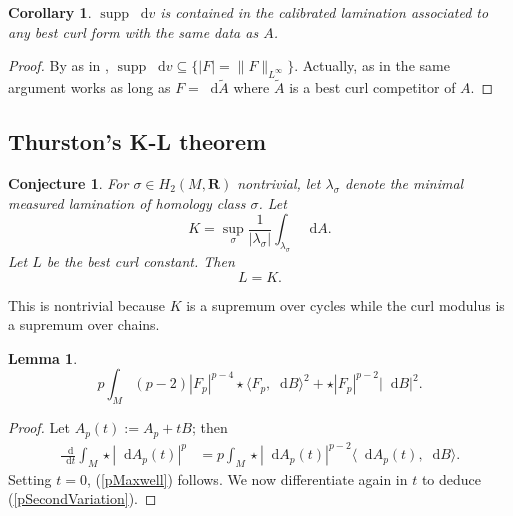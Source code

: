 \documentclass[reqno,11pt]{amsart}
\newcommand{\RR}{\mathbf{R}}
\newcommand*\dif{\mathop{}\!\mathrm{d}}
\DeclareMathOperator{\supp}{supp}
\newtheorem{lemma}[theorem]{Lemma}
\newtheorem{corollary}[theorem]{Corollary}
\newtheorem{conjecture}[theorem]{Conjecture}
\theoremstyle{definition}
\numberwithin{equation}{section}
\begin{document}
\begin{corollary}
$\supp \dif v$ is contained in the calibrated lamination associated to any best curl form with the same data as $A$.
\end{corollary}
\begin{proof}
By as in \cite[Theorem 6.1]{daskalopoulos2020transverse}, $\supp \dif v \subseteq \{|F| = \|F\|_{L^\infty}\}$.
Actually, as in \cite[Corollary 6.8]{daskalopoulos2020transverse} the same argument works as long as $F = \dif \tilde A$ where $\tilde A$ is a best curl competitor of $A$.
\end{proof}

\subsection{Thurston's K-L theorem}
\begin{conjecture}
For $\sigma \in H_2(M, \RR)$ nontrivial, let $\lambda_\sigma$ denote the minimal measured lamination of homology class $\sigma$.
Let 
$$K = \sup_\sigma \frac{1}{|\lambda_\sigma|} \int_{\lambda_\sigma} \dif A.$$
Let $L$ be the best curl constant. Then 
$$L = K.$$
\end{conjecture}

This is nontrivial because $K$ is a supremum over cycles while the curl modulus is a supremum over chains.

\begin{lemma}
\begin{equation}\label{pSecondVariation}
	p \int_M (p - 2) |F_p|^{p - 4} \star \langle F_p, \dif B\rangle^2 + \star |F_p|^{p - 2} |\dif B|^2.
	\end{equation}
	\end{lemma}
	\begin{proof}
	Let $A_p(t) := A_p + tB$; then 
	\begin{align*}
		\frac{\dif}{\dif t} \int_M \star |\dif A_p(t)|^p
		&= p \int_M \star |\dif A_p(t)|^{p - 2} \langle\dif A_p(t), \dif B\rangle.
	\end{align*}
	Setting $t = 0$, (\ref{pMaxwell}) follows.
	We now differentiate again in $t$ to deduce (\ref{pSecondVariation}).
	\end{proof}

\printbibliography
\end{document}
